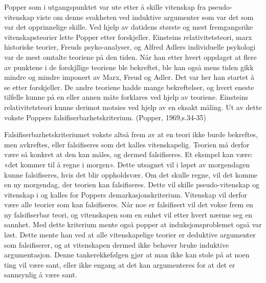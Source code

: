 \documentclass[
]{book}
\begin{document}
Popper som i utgangspunktet var ute etter å skille vitenskap fra pseudo-vitenskap viste om denne svakheten ved induktive argumenter som var det som var det opprinnelige skille. Ved hjelp av datidens største og mest fremgangsrike vitenskapsteorier lette Popper etter forskjeller. Einsteins relativitetsteori, marx historiske teorier, Freuds psyko-analyser, og Alfred Adlers individuelle psykologi var de mest omtalte teoriene på den tiden. Når han etter hvert oppdaget at flere av punktene i de forskjllige teoriene ble bekreftet, ble han også mens tiden gikk mindre og mindre imponert av Marx, Freud og Adler. Det var her han startet å se etter forskjeller. De andre teoriene hadde mange bekreftelser, og hvert eneste tilfelle kunne på en eller annen måte forklares ved hjelp av teoriene. Einsteins relativitetsteori kunne derimot motsies ved hjelp av en eksakt måling. Ut av dette vokste Poppers falsifiserbarhetskriterium. (Popper, 1969,s.34-35)

Falsifiserbarhetskriteriumet vokste altså frem av at en teori ikke burde bekreftes, men avkreftes, eller falsifiseres som det kalles vitenskapelig. Teorien må derfor være så konkret at den kan måles, og dermed falsifiseres. Et eksmpel kan være: «det kommer til å regne i morgen». Dette utsagnet vil i løpet av morgendagen kunne falsifiseres, hvis det blir oppholdsvær. Om det skulle regne, vil det komme en ny morgendag, der teorien kan falsifiseres. Dette vil skille pseudo-vitenskap og vitenskap i og kalles for Poppers demarkasjonskriterium. Vitenskap vil derfor være alle teorier som kan falsifiseres. Når noe er falsifisert vil det vokse frem en ny falsifiserbar teori, og vitenskapen som en enhet vil etter hvert nærme seg en sannhet. Med dette kriterium mente også popper at induksjonsproblemet også var løst. Dette mente han ved at alle vitenskapelige teorier er deduktive argumenter som falsifiserer, og at vitenskapen dermed ikke behøver bruke induktive argumentasjon. Denne tankerekkefølgen gjør at man ikke kan stole på at noen ting vil være sant, eller ikke engang at det kan argumenteres for at det er sannsynlig å være sant.
\end{document}
